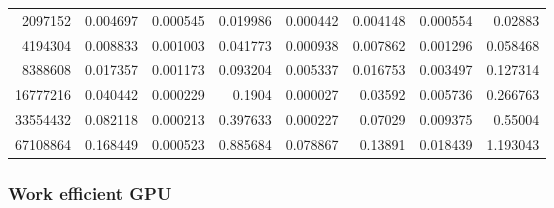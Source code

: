 \begin{tabular}{r r r r r r r r}
2097152 & 0.004697 & 0.000545 & 0.019986 & 0.000442 & 0.004148 & 0.000554 & 0.02883 \\
4194304 & 0.008833 & 0.001003 & 0.041773 & 0.000938 & 0.007862 & 0.001296 & 0.058468 \\
8388608 & 0.017357 & 0.001173 & 0.093204 & 0.005337 & 0.016753 & 0.003497 & 0.127314 \\
16777216 & 0.040442 & 0.000229 & 0.1904 & 0.000027 & 0.03592 & 0.005736 & 0.266763 \\
33554432 & 0.082118 & 0.000213 & 0.397633 & 0.000227 & 0.07029 & 0.009375 & 0.55004 \\
67108864 & 0.168449 & 0.000523 & 0.885684 & 0.078867 & 0.13891 & 0.018439 & 1.193043 \\
\end{tabular}

\subsubsection{Work efficient GPU}


